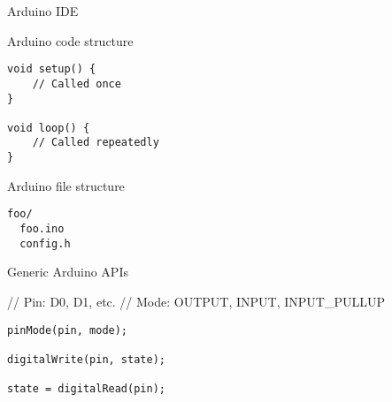 \begin{frame}{Arduino IDE}
\protect\hypertarget{arduino-ide}{}

\end{frame}

\begin{frame}[fragile]{Arduino code structure}
\protect\hypertarget{arduino-code-structure}{}

\begin{verbatim}
void setup() {
    // Called once
}

void loop() {
    // Called repeatedly
}
\end{verbatim}


\end{frame}

\begin{frame}[fragile]{Arduino file structure}
\protect\hypertarget{arduino-file-structure}{}

\begin{verbatim}
foo/
  foo.ino
  config.h
\end{verbatim}


\end{frame}

\begin{frame}[fragile]{Generic Arduino APIs}
\protect\hypertarget{generic-arduino-apis}{}

// Pin: D0, D1, etc. // Mode: OUTPUT, INPUT, INPUT\_PULLUP

\begin{verbatim}
pinMode(pin, mode);

digitalWrite(pin, state);

state = digitalRead(pin);
\end{verbatim}

\end{frame}

